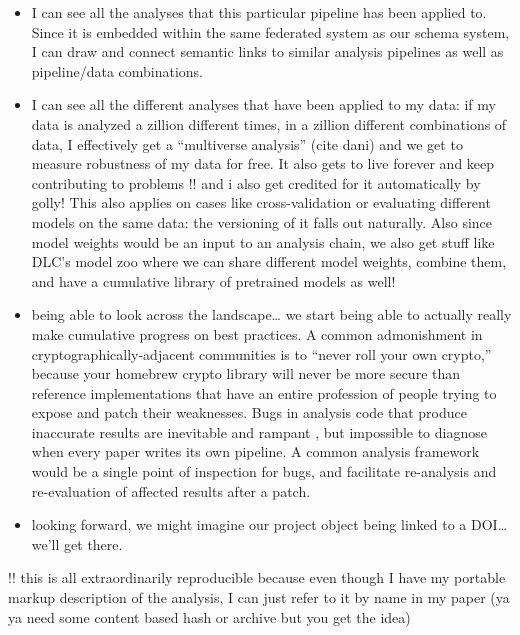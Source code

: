 \documentclass[10pt]{article}
\begin{document}
\begin{multicols}{2}
\begin{itemize}
  \begin{itemize}
  
  \item
    I can see all the analyses that this particular pipeline has been
    applied to. Since it is embedded within the same federated system as
    our schema system, I can draw and connect semantic links to similar
    analysis pipelines as well as pipeline/data combinations.
  \item
    I can see all the different analyses that have been applied to my
    data: if my data is analyzed a zillion different times, in a zillion
    different combinations of data, I effectively get a ``multiverse
    analysis'' (cite dani) and we get to measure robustness of my data
    for free. It also gets to live forever and keep contributing to
    problems !! and i also get credited for it automatically by golly!
    This also applies on cases like cross-validation or evaluating
    different models on the same data: the versioning of it falls out
    naturally. Also since model weights would be an input to an analysis
    chain, we also get stuff like DLC's model zoo where we can share
    different model weights, combine them, and have a cumulative library
    of pretrained models as well!
  \item
    being able to look across the landscape\ldots{} we start being able
    to actually really make cumulative progress on best practices. A
    common admonishment in cryptographically-adjacent communities is to
    ``never roll your own crypto,'' because your homebrew crypto library
    will never be more secure than reference implementations that have
    an entire profession of people trying to expose and patch their
    weaknesses. Bugs in analysis code that produce inaccurate results
    are inevitable and rampant \cite{millerScientistNightmareSoftware2006, soergelRampantSoftwareErrors2015, eklundClusterFailureWhy2016a, bhandarineupaneCharacterizationLeptazolinesPolar2019} , but
    impossible to diagnose when every paper writes its own pipeline. A
    common analysis framework would be a single point of inspection for
    bugs, and facilitate re-analysis and re-evaluation of affected
    results after a patch.
  \item
    looking forward, we might imagine our project object being linked to
    a DOI\ldots{} we'll get there.
  \end{itemize}
\end{itemize}

!! this is all extraordinarily reproducible because even though I have
my portable markup description of the analysis, I can just refer to it
by name in my paper (ya ya need some content based hash or archive but
you get the idea)


\end{multicols}
\end{document}
